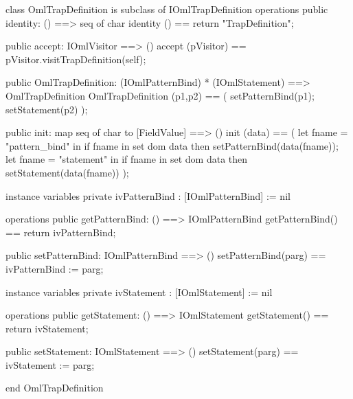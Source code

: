 \begin{vdm_al}
class OmlTrapDefinition is subclass of IOmlTrapDefinition
operations
  public identity: () ==> seq of char
  identity () == return "TrapDefinition";

  public accept: IOmlVisitor ==> ()
  accept (pVisitor) == pVisitor.visitTrapDefinition(self);

  public OmlTrapDefinition:
      (IOmlPatternBind) *
      (IOmlStatement) ==> OmlTrapDefinition
  OmlTrapDefinition (p1,p2) == 
   ( setPatternBind(p1);
     setStatement(p2) );

  public init: map seq of char to [FieldValue] ==> ()
  init (data) ==
    ( let fname = "pattern_bind" in
        if fname in set dom data
        then setPatternBind(data(fname));
      let fname = "statement" in
        if fname in set dom data
        then setStatement(data(fname)) );

instance variables
  private ivPatternBind : [IOmlPatternBind] := nil

operations
  public getPatternBind: () ==> IOmlPatternBind
  getPatternBind() == return ivPatternBind;

  public setPatternBind: IOmlPatternBind ==> ()
  setPatternBind(parg) == ivPatternBind := parg;

instance variables
  private ivStatement : [IOmlStatement] := nil

operations
  public getStatement: () ==> IOmlStatement
  getStatement() == return ivStatement;

  public setStatement: IOmlStatement ==> ()
  setStatement(parg) == ivStatement := parg;

end OmlTrapDefinition
\end{vdm_al}

